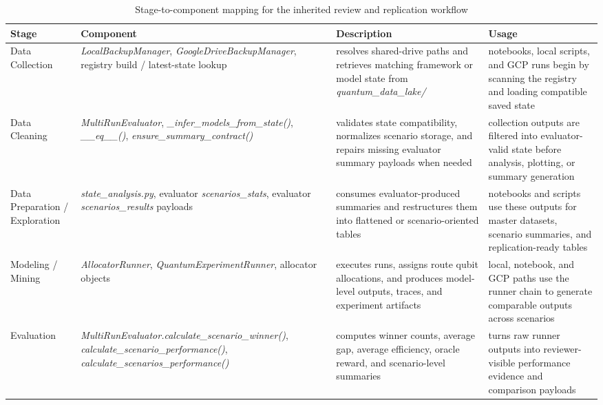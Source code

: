 \documentclass{IEEEtran}
\begin{document}
\begin{table}[!t]
\centering
\caption{Stage-to-component mapping for the inherited review and replication workflow}
\label{tab:stage_objects}
\small
\begin{tabularx}{\textwidth}{>{\raggedright\arraybackslash}p{2.7cm} >{\raggedright\arraybackslash}p{4.7cm} >{\raggedright\arraybackslash}p{4.3cm} >{\raggedright\arraybackslash}p{5.0cm}}
\toprule
\rowcolor{phase2green!18}
\textbf{Stage} & \textbf{Component} & \textbf{Description} & \textbf{Usage} \\
\midrule

\rowcolor{phase3orange!12}
Data Collection & \textit{LocalBackupManager}, \textit{GoogleDriveBackupManager}, registry build / latest-state lookup & resolves shared-drive paths and retrieves matching framework or model state from \textit{quantum\_data\_lake/} & notebooks, local scripts, and GCP runs begin by scanning the registry and loading compatible saved state \\
\midrule

\rowcolor{phase3orange!12}
Data Cleaning & \textit{MultiRunEvaluator}, \textit{\_infer\_models\_from\_state()}, \textit{\_\_eq\_\_()}, \textit{ensure\_summary\_contract()} & validates state compatibility, normalizes scenario storage, and repairs missing evaluator summary payloads when needed & collection outputs are filtered into evaluator-valid state before analysis, plotting, or summary generation \\
\midrule

\rowcolor{phase3orange!12}
Data Preparation / Exploration & \textit{state\_analysis.py}, evaluator \textit{scenarios\_stats}, evaluator \textit{scenarios\_results} payloads & consumes evaluator-produced summaries and restructures them into flattened or scenario-oriented tables & notebooks and scripts use these outputs for master datasets, scenario summaries, and replication-ready tables \\
\midrule

\rowcolor{phase3orange!12}
Modeling / Mining & \textit{AllocatorRunner}, \textit{QuantumExperimentRunner}, allocator objects & executes runs, assigns route qubit allocations, and produces model-level outputs, traces, and experiment artifacts & local, notebook, and GCP paths use the runner chain to generate comparable outputs across scenarios \\
\midrule

\rowcolor{phase3orange!12}
Evaluation & \textit{MultiRunEvaluator.calculate\_scenario\_winner()}, \textit{calculate\_scenario\_performance()}, \textit{calculate\_scenarios\_performance()} & computes winner counts, average gap, average efficiency, oracle reward, and scenario-level summaries & turns raw runner outputs into reviewer-visible performance evidence and comparison payloads \\
\midrule


\end{tabularx}
\end{table}
\end{document}
